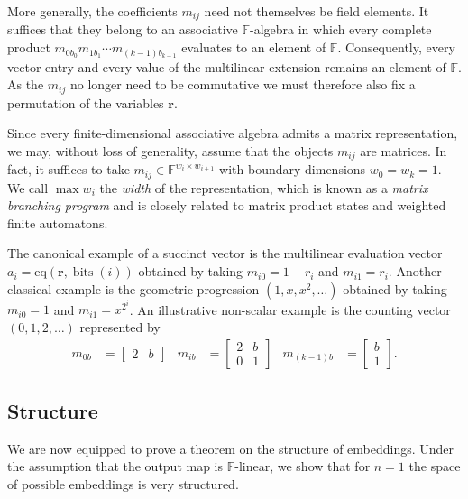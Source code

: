 \documentclass[11pt,letterpaper,usenames,dvipsnames]{article}
\begin{document}
More generally, the coefficients $m_{ij}$ need not themselves be field elements. It suffices that they belong to an associative $\mathbb{F}$-algebra in which every complete product $m_{0b_0}m_{1b_1}\cdots m_{(k-1)b_{k-1}}$ evaluates to an element of $\mathbb{F}$. Consequently, every vector entry and every value of the multilinear extension remains an element of $\mathbb{F}$. As the $m_{ij}$ no longer need to be commutative we must therefore also fix a permutation of the variables $\mathbf{r}$.

Since every finite-dimensional associative algebra admits a matrix representation, we may, without loss of generality, assume that the objects $m_{ij}$ are matrices. In fact, it suffices to take $m_{ij}\in\mathbb{F}^{w_i\times w_{i+1}}$ with boundary dimensions $w_0=w_k=1$. We call $\max w_i$ the \emph{width} of the representation, which is known as a \emph{matrix branching program} and is closely related to matrix product states and weighted finite automatons.

The canonical example of a succinct vector is the multilinear evaluation vector $a_i = \mathrm{eq}(\mathbf{r}, \operatorname{bits}(i))$ obtained by taking $m_{i0} = 1 - r_i$ and $m_{i1} = r_i$. Another classical example is the geometric progression $(1, x, x^2, \dots)$ obtained by taking $m_{i0} = 1$ and $m_{i1} = x^{2^i}$. An illustrative non-scalar example is the counting vector $(0, 1, 2, \dots)$ represented by
\[
\begin{aligned}
m_{0b} &= \begin{bmatrix}
2 & b    
\end{bmatrix} &
m_{ib} &= \begin{bmatrix}
2 & b \\
0 &  1
\end{bmatrix} &
m_{(k-1)b} &= \begin{bmatrix}
b \\
1
\end{bmatrix}\text{.}
\end{aligned}
\]




\subsection{Structure}
We are now equipped to prove a theorem on the structure of embeddings. Under the assumption that the output map is $\mathbb{F}$-linear, we show that for $n=1$ the space of possible embeddings is very structured.
\end{document}
